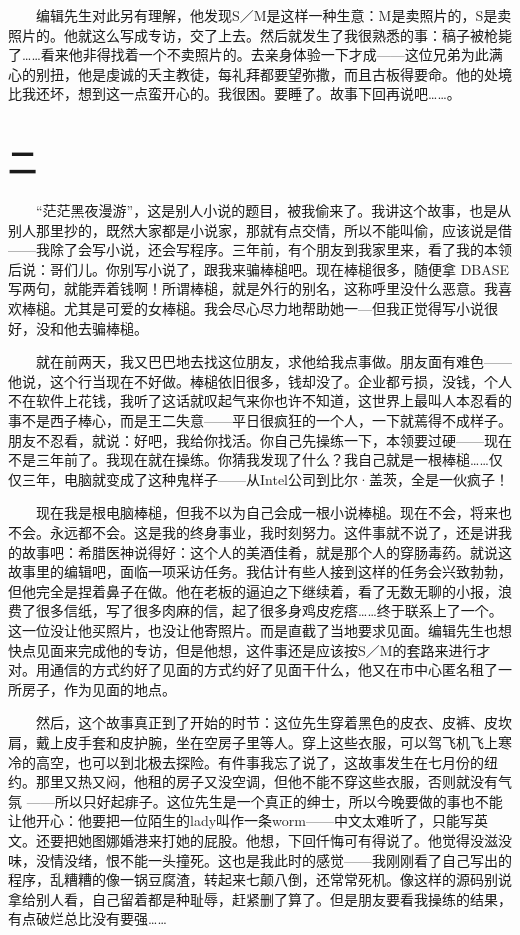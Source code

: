 　　编辑先生对此另有理解，他发现S／M是这样一种生意：M是卖照片的，S是卖照片的。他就这么写成专访，交了上去。然后就发生了我很熟悉的事：稿子被枪毙了……看来他非得找着一个不卖照片的。去亲身体验一下才成——这位兄弟为此满心的别扭，他是虔诚的夭主教徒，每礼拜都要望弥撒，而且古板得要命。他的处境比我还坏，想到这一点蛮开心的。我很困。要睡了。故事下回再说吧……。 

\section{二} 

　　“茫茫黑夜漫游”，这是别人小说的题目，被我偷来了。我讲这个故事，也是从别人那里抄的，既然大家都是小说家，那就有点交情，所以不能叫偷，应该说是借——我除了会写小说，还会写程序。三年前，有个朋友到我家里来，看了我的本领后说：哥们儿。你别写小说了，跟我来骗棒槌吧。现在棒槌很多，随便拿 DBASE写两句，就能弄着钱啊！所谓棒槌，就是外行的别名，这称呼里没什么恶意。我喜欢棒槌。尤其是可爱的女棒槌。我会尽心尽力地帮助她一—但我正觉得写小说很好，没和他去骗棒槌。 

　　就在前两天，我又巴巴地去找这位朋友，求他给我点事做。朋友面有难色——他说，这个行当现在不好做。棒槌依旧很多，钱却没了。企业都亏损，没钱，个人不在软件上花钱，我听了这话就叹起气来你也许不知道，这世界上最叫人本忍看的事不是西子棒心，而是王二失意——平日很疯狂的一个人，一下就蔫得不成样子。朋友不忍看，就说：好吧，我给你找活。你自己先操练一下，本领要过硬——现在不是三年前了。我现在就在操练。你猜我发现了什么？我自己就是一根棒槌……仅仅三年，电脑就变成了这种鬼样子——从Intel公司到比尔·盖茨，全是一伙疯子！ 

　　现在我是根电脑棒槌，但我不以为自己会成一根小说棒槌。现在不会，将来也不会。永远都不会。这是我的终身事业，我时刻努力。这件事就不说了，还是讲我的故事吧：希腊医神说得好：这个人的美酒佳肴，就是那个人的穿肠毒药。就说这故事里的编辑吧，面临一项采访任务。我估计有些人接到这样的任务会兴致勃勃，但他完全是捏着鼻子在做。他在老板的逼迫之下继续着，看了无数无聊的小报，浪费了很多信纸，写了很多肉麻的信，起了很多身鸡皮疙瘩……终于联系上了一个。这一位没让他买照片，也没让他寄照片。而是直截了当地要求见面。编辑先生也想快点见面来完成他的专访，但是他想，这件事还是应该按S／M的套路来进行才对。用通信的方式约好了见面的方式约好了见面干什么，他又在市中心匿名租了一所房子，作为见面的地点。 

　　然后，这个故事真正到了开始的时节：这位先生穿着黑色的皮衣、皮裤、皮坎肩，戴上皮手套和皮护腕，坐在空房子里等人。穿上这些衣服，可以驾飞机飞上寒冷的高空，也可以到北极去探险。有件事我忘了说了，这故事发生在七月份的纽约。那里又热又闷，他租的房子又没空调，但他不能不穿这些衣服，否则就没有气氛 ——所以只好起痱子。这位先生是一个真正的绅士，所以今晚要做的事也不能让他开心：他要把一位陌生的lady叫作一条worm——中文太难听了，只能写英文。还要把她图娜婚港来打她的屁股。他想，下回仟悔可有得说了。他觉得没滋没味，没情没绪，恨不能一头撞死。这也是我此时的感觉——我刚刚看了自己写出的程序，乱糟糟的像一锅豆腐渣，转起来七颠八倒，还常常死机。像这样的源码别说拿给别人看，自己留着都是种耻辱，赶紧删了算了。但是朋友要看我操练的结果，有点破烂总比没有要强…… 

